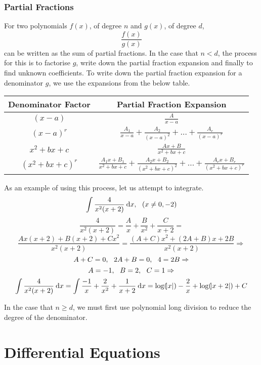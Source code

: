 \documentclass[12pt]{report}
\begin{document}
\begin{flushleft}
\subsubsection*{Partial Fractions}

For two polynomials \(f(x)\), of degree \(n\) and \(g(x)\), of degree \(d\),
\[\frac{f(x)}{g(x)}\]
can be written as the sum of partial fractions. In the case that \(n < d\), the
process for this is to factorise \(g\), write down the partial fraction
expansion and finally to find unknown coefficients. To write down the partial
fraction expansion for a denominator \(g\), we use the expansions from the
below table.

\renewcommand{\arraystretch}{2}
\begin{center}    
    \begin{tabular}{||c|c||}
        Denominator Factor & Partial Fraction Expansion \\
        \hline
        \hline
        \((x - a)\) & \(\frac{A}{x - a}\) \\
        \((x - a)^r\) & \(\frac{A_1}{x - a} + \frac{A_2}{(x - a)^2} + \ldots +
        \frac{A_r}{(x - a)^r}\) \\
        \(x^2 + bx + c\) & \(\frac{Ax + B}{x^2 + bx + c}\) \\
        \((x^2 + bx + c)^r\) & \(\frac{A_1x + B_1}{x^2 + bx + c} +
        \frac{A_2x + B_2}{(x^2 + bx + c)^2} + \ldots 
        + \frac{A_rx + B_r}{(x^2 + bx + c)^r}\) \\
    \end{tabular}
\end{center}
\renewcommand{\arraystretch}{1}

As an example of using this process, let us attempt to integrate.
\[\int \frac{4}{x^2(x + 2)} \:\mathrm{d}x, \:\:\: (x\neq0, -2)\]
\[\frac{4}{x^2(x + 2)} = \frac{A}{x} + \frac{B}{x^2} + \frac{C}{x + 2} = \]
\[\frac{Ax(x + 2) + B(x + 2) + Cx^2}{x^2(x + 2)}
= \frac{(A + C)x^2 + (2A + B)x + 2B}{x^2(x + 2)} \Rightarrow\]
\[A + C = 0 , \:\:\: 2A + B = 0 , \:\:\: 4 = 2B \Rightarrow\]
\[A = -1 , \:\:\: B = 2 , \:\:\: C = 1 \Rightarrow\]
\[\int \frac{4}{x^2(x + 2)} \:\mathrm{d}x = \int \frac{-1}{x} + \frac{2}{x^2} + 
\frac{1}{x + 2} \:\mathrm{d}x = \log(\abs{x}) - \frac{2}{x} + \log(\abs{x + 2}) + C\]

In the case that \(n \geq d\), we must first use polynomial long division to
reduce the degree of the denominator.

\section*{Differential Equations}


\end{flushleft}
\end{document}
